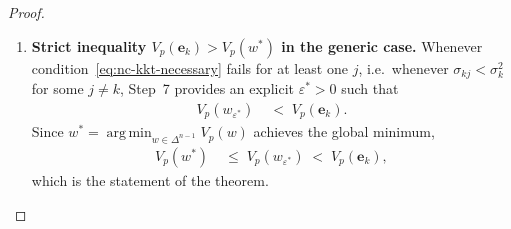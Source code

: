 \documentclass[12pt,openany]{book}
\newcommand{\bfw}{\mathbf{w}}
\newcommand{\bfe}{\mathbf{e}}
\DeclareMathOperator*{\argmin}{arg\,min}
\numberwithin{equation}{chapter}
\theoremstyle{plain}
\theoremstyle{definition}
\theoremstyle{remark}
\def\bfw{w}%
\begin{document}
\begin{proof}
\begin{enumerate}
  \item \textbf{Strict inequality $V_p(\bfe_k) > V_p(\bfw^*)$
        in the generic case.}
        Whenever condition~\eqref{eq:nc-kkt-necessary} fails for
        at least one $j$, i.e.\ whenever
        $\sigma_{kj} < \sigma_k^2$ for some $j \neq k$,
        Step~7 provides an explicit $\varepsilon^* > 0$ such that
        \begin{align}
          V_p(\bfw_{\varepsilon^*})
          &\;<\; V_p(\bfe_k).
          \label{eq:nc-strict}
        \end{align}
        Since $\bfw^* = \argmin_{\bfw \in \Delta^{n-1}} V_p(\bfw)$
        achieves the global minimum,
        \begin{align}
          V_p(\bfw^*)
          &\;\leq\; V_p(\bfw_{\varepsilon^*})
           \;<\; V_p(\bfe_k),
          \label{eq:nc-final}
        \end{align}
        which is the statement of the theorem.


\end{enumerate}
\end{proof}
\end{document}
